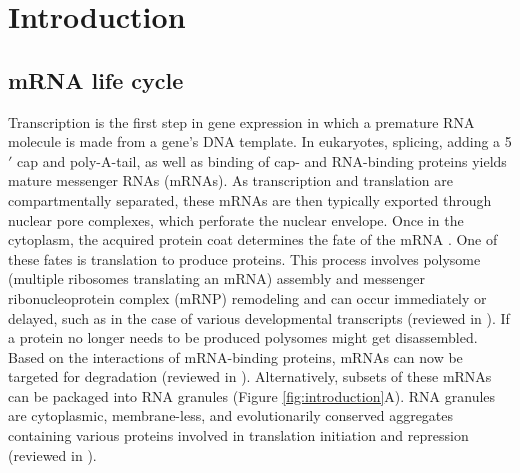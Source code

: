 \chapter{Introduction}


\section{mRNA life cycle}

Transcription is the first step in gene expression in which a premature RNA molecule is made from a gene's DNA template.
In eukaryotes, splicing, adding a 5$'$ cap and poly-A-tail, as well as binding of cap- and RNA-binding proteins yields mature messenger RNAs (mRNAs).
As transcription and translation are compartmentally separated, these mRNAs are then typically exported through nuclear pore complexes, which perforate the nuclear envelope.
Once in the cytoplasm, the acquired protein coat determines the fate of the mRNA \cite{moore_birth_2005}.
One of these fates is translation to produce proteins.
This process involves polysome (multiple ribosomes translating an mRNA) assembly and messenger ribonucleoprotein complex (mRNP) remodeling and can occur immediately or delayed, such as in the case of various developmental transcripts (reviewed in \cite{swinburne_intron_2008}).
If a protein no longer needs to be produced polysomes might get disassembled.
Based on the interactions of mRNA-binding proteins, mRNAs can now be targeted for degradation (reviewed in \cite{schoenberg_regulation_2012}).
Alternatively, subsets of these mRNAs can be packaged into RNA granules (Figure \ref{fig:introduction}A).
RNA granules are cytoplasmic, membrane-less, and evolutionarily conserved aggregates containing various proteins involved in translation initiation and repression (reviewed in \cite{anderson_rna_2006}).

